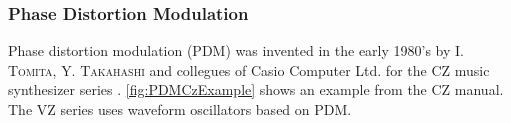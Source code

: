 \documentclass[a4paper]{article}
\newcommand\person[1]{\textsc{#1}}
\begin{document}
\subsubsection{Phase Distortion Modulation}
\newcommand\PDMcharact[3]{{%
  \begin{scope}[shift={(#1,#2)}]
    \def\aI{#3}
    \def\xxI{1/(2*\aI)}
    \draw[thick,domain=0:\xxI,variable=\x] plot ({\x},{\a*\x});
    \draw[thick,domain=\xxI:1,variable=\x] plot ({\x},{(\a*\x+\a-1)/(2*\a-1)});
  \end{scope}
}}
\newcommand\PDMsine[3]{{%
  \begin{scope}[shift={(#1,#2)}]
    \def\aI{#3}
    \def\xxI{1/(2*\aI)}
    \draw[very thin,dashed,domain=0:1,variable=\x] plot ({\x},{0.5*sin(360*\x+90)});
    \draw[thick,domain=0:\xxI,variable=\x] plot ({\x},{0.5*sin(360*\a*\x+90)});
    \draw[thick,domain=\xxI:1,variable=\x] plot ({\x},{0.5*sin(360*((\a*\x+\a-1)/(2*\a-1))+90)});
  \end{scope}
}}
Phase distortion modulation (PDM) was invented in the early 1980's by \person{I.
Tomita}, \person{Y. Takahashi} and collegues of Casio Computer Ltd. for the CZ
music synthesizer series \cite{Ger09}. \cref{fig:PDMCzExample} shows an example
from the CZ manual. The VZ series uses waveform oscillators based on PDM.
\end{document}

